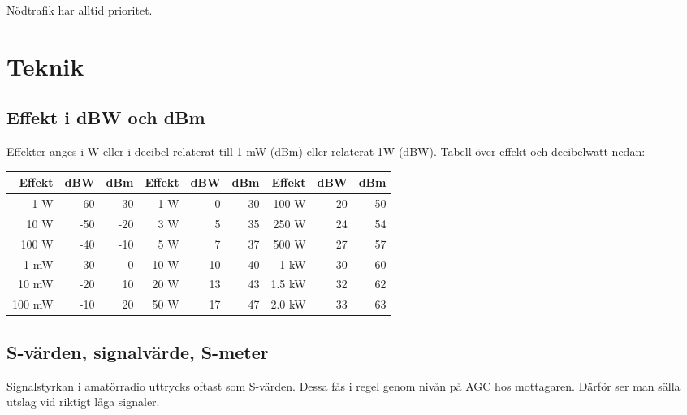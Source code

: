 Nödtrafik har alltid prioritet.



\section{Teknik}

\subsection{Effekt i dBW och dBm}

Effekter anges i W eller i decibel relaterat till 1 mW (dBm) eller relaterat 1W (dBW). Tabell över effekt och decibelwatt nedan:
\begin{center}
\begin{tabular}{rrr|rrr|rrr}
	   \textbf{Effekt} & \textbf{dBW} & \textbf{dBm} & \textbf{Effekt} & \textbf{dBW} & \textbf{dBm} & \textbf{Effekt} & \textbf{dBW} & \textbf{dBm} \\ \hline
	  1 \textmu W &          -60 &          -30 &        1 W &            0 &           30 &      100 W &           20 &           50 \\
	 10 \textmu W &          -50 &          -20 &        3 W &            5 &           35 &      250 W &           24 &           54 \\
	100 \textmu W &          -40 &          -10 &        5 W &            7 &           37 &      500 W &           27 &           57 \\
	         1 mW &          -30 &            0 &       10 W &           10 &           40 &       1 kW &           30 &           60 \\
	        10 mW &          -20 &           10 &       20 W &           13 &           43 &     1.5 kW &           32 &           62 \\
	       100 mW &          -10 &           20 &       50 W &           17 &           47 &     2.0 kW &           33 &           63
\end{tabular}
\end{center}

\subsection{S-värden, signalvärde, S-meter}

Signalstyrkan i amatörradio uttrycks oftast som S-värden. Dessa fås i regel genom nivån på AGC hos mottagaren. Därför ser man sälla utslag vid riktigt låga signaler.

